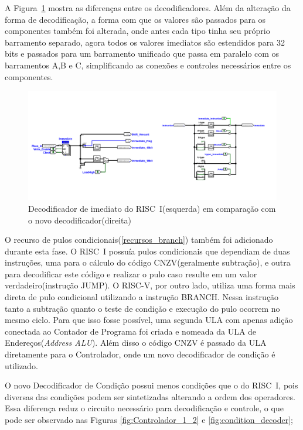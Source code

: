 \documentclass[
	12pt,				%
	openright,			%
	oneside,			%
	a4paper,			%
	english,			%
	french,				%
	spanish,			%
	brazil,				%
	]{abntex2}
\begin{document}
A Figura~\ref{fig:immediates1} mostra as diferenças entre os decodificadores. Além da alteração da forma de decodificação, a forma com que os valores são passados para os componentes também foi alterada, onde antes cada tipo tinha seu próprio barramento separado, agora todos os valores imediatos são estendidos para 32 bits e passados para um barramento unificado que passa em paralelo com os barramentos A,B e C, simplificando as conexões e controles necessários entre os componentes. 

\begin{figure}
    \centering
    \includegraphics[width=1\linewidth]{ProcessoDesenvolvimento/Arquitetura/Immediates1.png}
    \caption{Decodificador de imediato do RISC~I(esquerda) em comparação com o novo decodificador(direita)}
    \label{fig:immediates1}
\end{figure}

O recurso de pulos condicionais(\ref{recursos_branch}) também foi adicionado durante esta fase. O RISC~I possuía pulos condicionais que dependiam de duas instruções, uma para o cálculo do código CNZV(geralmente subtração), e outra para decodificar este código e realizar o pulo caso resulte em um valor verdadeiro(instrução JUMP). 
O RISC-V, por outro lado, utiliza uma forma mais direta de pulo condicional utilizando a instrução BRANCH. Nessa instrução tanto a subtração quanto o teste de condição e execução do pulo ocorrem no mesmo ciclo. Para que isso fosse possível, uma segunda ULA com apenas adição conectada ao Contador de Programa foi criada e nomeada da ULA de Endereços(\textit{Address ALU}). Além disso o código CNZV é passado da ULA diretamente para o Controlador, onde um novo decodificador de condição é utilizado.

O novo Decodificador de Condição possui menos condições que o do RISC~I, pois diversas das condições podem ser sintetizadas alterando a ordem dos operadores. Essa diferença reduz o circuito necessário para decodificação e controle, o que pode ser observado nas Figuras \ref{fig:Controlador_1_2} e \ref{fig:condition_decoder};
\end{document}
